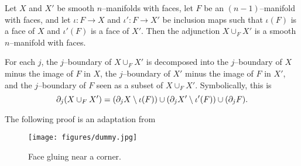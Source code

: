 \begin{prop}
	\label{prop:addface}
	Let $X$ and $X'$ be smooth $n$--manifolds with faces, let $F$ be an $(n-1)$--manifold with faces, and let $\iota:F\to X$ and $\iota':F\to X'$ be inclusion maps such that $\iota(F)$ is a face of $X$ and $\iota'(F)$ is a face of $X'$.
	Then the adjunction $X\cup_F X'$ is a smooth $n$--manifold with faces.
	
	For each $j$, the $j$--boundary of $X\cup_F X'$ is decomposed into the $j$--boundary of $X$ minus the image of $F$ in $X$, the $j$--boundary of $X'$ minus the image of $F$ in $X'$, and the $j$--boundary of $F$ seen as a subset of $X\cup_F X'$.
	Symbolically, this is $$\partial_j( X \cup_F X') = (\partial_j X\setminus \iota(F))\cup(\partial_j X'\setminus \iota'(F))\cup(\partial_j F).$$
\end{prop}

The following proof is an adaptation from \cite{davis}

\begin{figure}[H]
	\centering
	\caption{Face gluing near a corner.}
	\texttt{[image: figures/dummy.jpg]}
	\label{fig:addface}
\end{figure}

